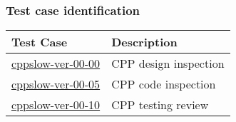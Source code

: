 \subsubsection{Test case identification}

\begin{longtable} {|p{}|p{}|}\hline
\textbf{Test Case}  & \textbf{Description} \\\hline
\hyperref[cppslow-ver-00-00]{cppslow-ver-00-00} & CPP design inspection \\\hline
\hyperref[cppslow-ver-00-05]{cppslow-ver-00-05} & CPP code inspection \\\hline
\hyperref[cppslow-ver-00-10]{cppslow-ver-00-10} & CPP testing review \\\hline
\end{longtable}
